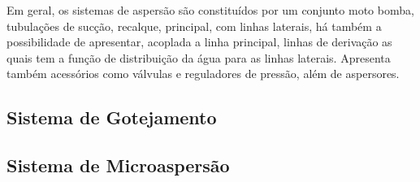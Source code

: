 Em geral, os sistemas de aspersão são constituídos por um conjunto moto bomba, tubulações de sucção, recalque, principal, com linhas laterais, há também a possibilidade de apresentar, acoplada a linha principal, linhas de derivação as quais tem a função de distribuição da água para as linhas laterais. Apresenta também acessórios como válvulas e reguladores de pressão, além de aspersores.

\subsection{Sistema de Gotejamento}

\subsection{Sistema de Microaspersão}
